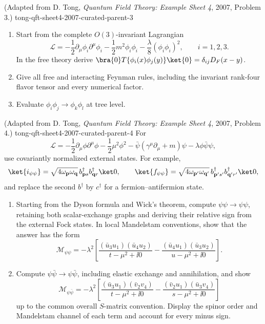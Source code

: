\begin{enumerate}
  {(Adapted from D. Tong, \emph{Quantum Field Theory: Example Sheet 4}, 2007, Problem 3.)}
  {tong-qft-sheet4-2007-curated-parent-3}
\begin{enumerate}
\item Start from the complete \(O(3)\)-invariant Lagrangian
\[
 \mathcal L=-\frac12\partial_\mu\phi_i\partial^\mu\phi_i
 -\frac12m^2\phi_i\phi_i-\frac{\lambda}{8}(\phi_i\phi_i)^2,
 \qquad i=1,2,3.
\]
In the free theory derive
\(\bra{0}T\{\phi_i(x)\phi_j(y)\}\ket{0}
=\delta_{ij}D_F(x-y)\).
\item Give all free and interacting Feynman rules, including the
invariant rank-four flavor tensor and every numerical factor.
\item Evaluate \(\phi_i\phi_j\to\phi_k\phi_l\) at tree level.
\end{enumerate}

  {(Adapted from D. Tong, \emph{Quantum Field Theory: Example Sheet 4}, 2007, Problem 4.)}
  {tong-qft-sheet4-2007-curated-parent-4}
For
\[
 \mathcal L=-\frac12\partial_\mu\phi\partial^\mu\phi
 -\frac12\mu^2\phi^2
 -\bar\psi(\gamma^\mu\partial_\mu+m)\psi
 -\lambda\phi\bar\psi\psi ,
\]
use covariantly normalized external states.  For example,
\[
 \ket{i_{\psi\psi}}
 =\sqrt{4\omega_{\mathbf p}\omega_{\mathbf q}}\,
 b^\dagger_{\mathbf p s}b^\dagger_{\mathbf q r}\ket0,\qquad
 \ket{f_{\psi\psi}}
 =\sqrt{4\omega_{\mathbf p'}\omega_{\mathbf q'}}\,
 b^\dagger_{\mathbf p's'}b^\dagger_{\mathbf q'r'}\ket0,
\]
and replace the second \(b^\dagger\) by \(c^\dagger\) for a
fermion--antifermion state.
\begin{enumerate}
\item Starting from the Dyson formula and Wick's theorem, compute
\(\psi\psi\to\psi\psi\), retaining both scalar-exchange graphs and
deriving their relative sign from the external Fock states.  In local
Mandelstam conventions, show that the answer has the form
\[
 \mathcal M_{\psi\psi}=-\lambda^2\left[
 \frac{(\bar u_3u_1)(\bar u_4u_2)}{t-\mu^2+\ii0}
 -\frac{(\bar u_4u_1)(\bar u_3u_2)}{u-\mu^2+\ii0}\right].
\]
\item Compute \(\psi\bar\psi\to\psi\bar\psi\), including elastic exchange
and annihilation, and show
\[
 \mathcal M_{\psi\bar\psi}=-\lambda^2\left[
 \frac{(\bar u_3u_1)(\bar v_2v_4)}{t-\mu^2+\ii0}
 -\frac{(\bar v_2u_1)(\bar u_3v_4)}{s-\mu^2+\ii0}\right]
\]
up to the common overall \(S\)-matrix convention.  Display the spinor
order and Mandelstam channel of each term and account for every minus
sign.
\end{enumerate}


\end{enumerate}

